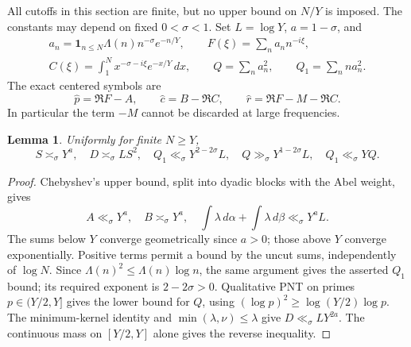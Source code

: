 \documentclass[11pt,a4paper]{article}
\newtheorem{lemma}[theorem]{Lemma}
\theoremstyle{definition}
\theoremstyle{remark}
\newcommand{\dd}{\,d}
\begin{document}
All cutoffs in this section are finite, but no upper bound on \(N/Y\)
is imposed. The constants may depend on fixed \(0<\sigma<1\).
Set \(L=\log Y\), \(a=1-\sigma\), and
\begin{gather*}
 a_n=\mathbf1_{n\le N}\Lambda(n)n^{-\sigma}e^{-n/Y},
 \qquad F(\xi)=\sum_n a_n n^{-i\xi},\\
 C(\xi)=\int_1^N x^{-\sigma-i\xi}e^{-x/Y}\dd x,\qquad
 Q=\sum_n a_n^2,\qquad Q_1=\sum_n n a_n^2.
\end{gather*}
The exact centered symbols are
\[
 \widehat p=\Re F-A,\qquad
 \widehat c=B-\Re C,\qquad
 \widehat r=\Re F-M-\Re C.
\]
In particular the term \(-M\) cannot be discarded at large frequencies.

\begin{lemma}\label{lem:uniformmoments}
Uniformly for finite \(N\ge Y\),
\[
 S\asymp_\sigma Y^a,\quad D\asymp_\sigma LS^2,\quad
 Q_1\ll_\sigma Y^{2-2\sigma}L,\quad
 Q\gg_\sigma Y^{1-2\sigma}L,\quad Q_1\ll_\sigma YQ.
\]
\end{lemma}
\begin{proof}
Chebyshev's upper bound, split into dyadic blocks with the Abel
weight, gives
\[
 A\ll_\sigma Y^a,\quad B\asymp_\sigma Y^a,\quad
 \int\lambda\dd\alpha+\int\lambda\dd\beta\ll_\sigma Y^aL.
\]
The sums below \(Y\) converge geometrically since \(a>0\); those
above \(Y\) converge exponentially. Positive terms permit a bound
by the uncut sums, independently of \(\log N\).
Since \(\Lambda(n)^2\le\Lambda(n)\log n\), the same argument gives
the asserted \(Q_1\) bound; its required exponent is \(2-2\sigma>0\).
Qualitative PNT on primes \(p\in(Y/2,Y]\) gives the lower bound for
\(Q\), using \((\log p)^2\ge\log(Y/2)\log p\).
The minimum-kernel identity and \(\min(\lambda,\nu)\le\lambda\)
give \(D\ll_\sigma LY^{2a}\). The continuous mass on \([Y/2,Y]\)
alone gives the reverse inequality.
\end{proof}
\end{document}
